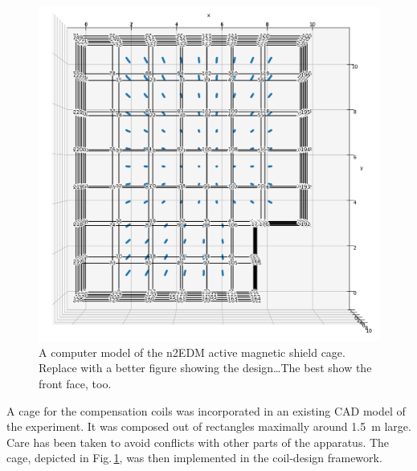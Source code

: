 \begin{figure}
  \centering
  \includegraphics[width=\linewidth]{gfx/prototype/n2EDM_system_top.png}
  \caption{A computer model of the n2EDM active magnetic shield cage. Replace with a better figure showing the design\ldots The best show the front face, too.}\label{fig:n2EDM_design_top}
\end{figure}

A cage for the compensation coils was incorporated in an existing CAD model of the experiment. It was composed out of rectangles maximally around \SI{1.5}{\metre} large. Care has been taken to avoid conflicts with other parts of the apparatus.
The cage, depicted in Fig.\,\ref{fig:n2EDM_design_top}, was then implemented in the coil-design framework.

